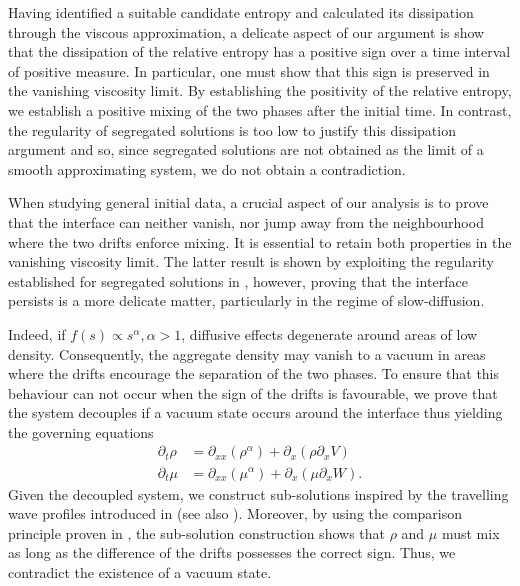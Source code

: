 \documentclass[a4paper,twosided, 11pt]{article}
\theoremstyle{plain}
\theoremstyle{remark}
\numberwithin{equation}{section}
\begin{document}
\medskip 

Having identified a suitable candidate entropy and calculated its dissipation through the viscous approximation, a delicate aspect of our argument is show that the dissipation of the relative entropy has a positive sign over a time interval of positive measure.
In particular, one must show that this sign is preserved in the vanishing viscosity limit. 
By establishing the positivity of the relative entropy, we establish a positive mixing of the two phases after the initial time.  
In contrast, the regularity of segregated solutions is too low to justify this dissipation argument and so, since segregated solutions are not obtained as the limit of a smooth approximating system, we do not obtain a contradiction.

\medskip 

When studying general initial data, a crucial aspect of our analysis is to prove that the interface can neither vanish, nor jump away from the neighbourhood where the two drifts enforce mixing. 
It is essential to retain both properties in the vanishing viscosity limit.
The latter result is shown by exploiting the regularity established for segregated solutions in \cite{santambrogioschulz2026segregated}, however, proving that the interface persists is a more delicate matter, particularly in the regime of slow-diffusion. 

\medskip 

Indeed, if $f(s) \propto s^\alpha, \alpha > 1$, diffusive effects degenerate around areas of low density.
Consequently, the aggregate density may vanish to a vacuum in areas where the drifts encourage the separation of the two phases.
To ensure that this behaviour can not occur when the sign of the drifts is favourable, we prove that the system decouples if a vacuum state occurs around the interface thus yielding the governing equations
\begin{align*}
    \partial_t\rho & = \partial_{xx}(\rho^\alpha) + \partial_x (\rho\partial_x V)\\
      \partial_t\mu & = \partial_{xx}(\mu^\alpha) + \partial_x (\mu\partial_x W).
\end{align*}
Given the decoupled system, we construct sub-solutions inspired by the travelling wave profiles introduced in \cite{ZeldovichKompaneec50} (see also \cite[Chapter X, $\mathsection$ 3]{ZeldovichRaizer67}). 
Moreover, by using the comparison principle proven in \cite{KimZhang18}, the sub-solution construction shows that $\rho$ and $\mu$ must mix as long as the difference of the drifts possesses the correct sign. 
Thus, we contradict the existence of a vacuum state.
\end{document}
